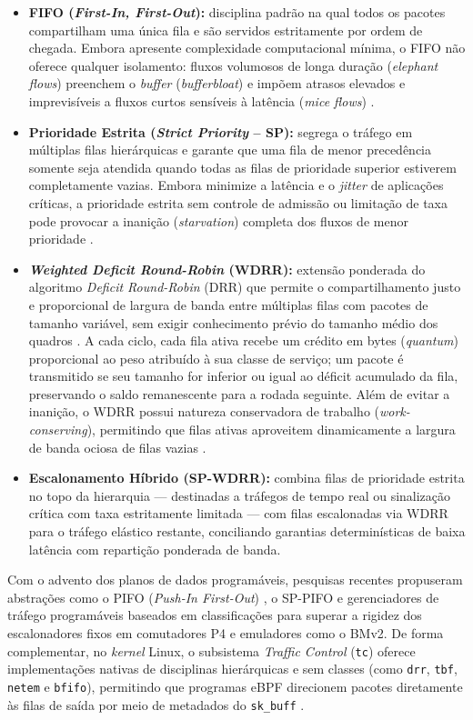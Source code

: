 \begin{itemize}
    \item \textbf{FIFO (\textit{First-In, First-Out}):} disciplina padrão na qual todos os pacotes compartilham uma única fila e são servidos estritamente por ordem de chegada. Embora apresente complexidade computacional mínima, o FIFO não oferece qualquer isolamento: fluxos volumosos de longa duração (\textit{elephant flows}) preenchem o \textit{buffer} (\textit{bufferbloat}) e impõem atrasos elevados e imprevisíveis a fluxos curtos sensíveis à latência (\textit{mice flows}) \cite{santos2024mtspolka}.
    \item \textbf{Prioridade Estrita (\textit{Strict Priority} -- SP):} segrega o tráfego em múltiplas filas hierárquicas e garante que uma fila de menor precedência somente seja atendida quando todas as filas de prioridade superior estiverem completamente vazias. Embora minimize a latência e o \textit{jitter} de aplicações críticas, a prioridade estrita sem controle de admissão ou limitação de taxa pode provocar a inanição (\textit{starvation}) completa dos fluxos de menor prioridade \cite{Elbediwy2025}.
    \item \textbf{\textit{Weighted Deficit Round-Robin} (WDRR):} extensão ponderada do algoritmo \textit{Deficit Round-Robin} (DRR) que permite o compartilhamento justo e proporcional de largura de banda entre múltiplas filas com pacotes de tamanho variável, sem exigir conhecimento prévio do tamanho médio dos quadros \cite{4489385}. A cada ciclo, cada fila ativa recebe um crédito em bytes (\textit{quantum}) proporcional ao peso atribuído à sua classe de serviço; um pacote é transmitido se seu tamanho for inferior ou igual ao déficit acumulado da fila, preservando o saldo remanescente para a rodada seguinte. Além de evitar a inanição, o WDRR possui natureza conservadora de trabalho (\textit{work-conserving}), permitindo que filas ativas aproveitem dinamicamente a largura de banda ociosa de filas vazias \cite{4489385, Elbediwy2025}.
    \item \textbf{Escalonamento Híbrido (SP-WDRR):} combina filas de prioridade estrita no topo da hierarquia --- destinadas a tráfegos de tempo real ou sinalização crítica com taxa estritamente limitada --- com filas escalonadas via WDRR para o tráfego elástico restante, conciliando garantias determinísticas de baixa latência com repartição ponderada de banda.
\end{itemize}

Com o advento dos planos de dados programáveis, pesquisas recentes propuseram abstrações como o PIFO (\textit{Push-In First-Out}) \cite{Sivaraman2016}, o SP-PIFO \cite{Alcoz2020} e gerenciadores de tráfego programáveis baseados em classificações \cite{Elbediwy2024, Elbediwy2025} para superar a rigidez dos escalonadores fixos em comutadores P4 e emuladores como o BMv2. De forma complementar, no \textit{kernel} Linux, o subsistema \textit{Traffic Control} (\texttt{tc}) oferece implementações nativas de disciplinas hierárquicas e sem classes (como \texttt{drr}, \texttt{tbf}, \texttt{netem} e \texttt{bfifo}), permitindo que programas eBPF direcionem pacotes diretamente às filas de saída por meio de metadados do \texttt{sk\_buff} \cite{sharaf2022extended}.

